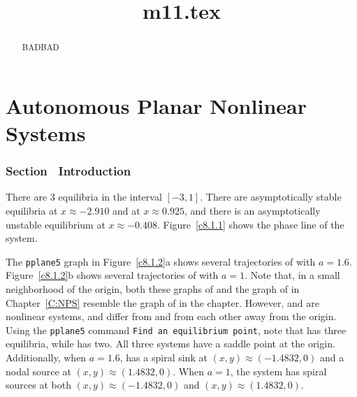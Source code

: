 \documentclass{ximera}
\title{m11.tex}
\begin{document}
\begin{abstract}
BADBAD
\end{abstract}
\maketitle

\chapter{Autonomous Planar Nonlinear Systems}

\subsection*{Section~\protect{\ref{S:introAPNS}} Introduction}

There are 3 equilibria in the interval $[-3,1]$.  There are
asymptotically stable equilibria at $x\approx -2.910$ and at 
$x\approx 0.925$, and there is an asymptotically unstable equilibrium at
$x \approx -0.408$.  Figure~\ref{c8.1.1} shows the phase line
of the system.

\begin{figure}[htb]
                       \centerline{%
                       }
\end{figure}

The {\tt pplane5} graph in Figure~\ref{c8.1.2}a shows several trajectories
 of  with $a = 1.6$.  Figure~\ref{c8.1.2}b shows
several trajectories of  with $a = 1$.  Note that, in
a small neighborhood of the origin, both these graphs of
 and the graph of  in
Chapter~\ref{C:NPS} resemble the graph of  in the
chapter.  However,  and  are
nonlinear systems, and differ from  and from each other
away from the origin.  Using the {\tt pplane5} command
{\tt Find an equilibrium point}, note that  has
three equilibria, while  has two.  All three systems
have a saddle point at the origin.  Additionally, when $a = 1.6$,
 has a spiral sink at $(x,y) \approx (-1.4832,0)$
and a nodal source at $(x,y) \approx (1.4832,0)$.  When $a = 1$, the
system has spiral sources at both $(x,y) \approx (-1.4832,0)$ and
$(x,y) \approx (1.4832,0)$.

\begin{figure}[htb]
                       \centerline{%
                       }
\end{figure}
\end{document}
